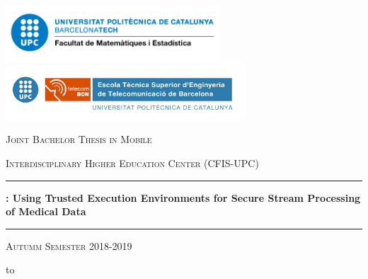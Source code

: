 \thispagestyle{empty}
\begin{center}

    \includegraphics[width=8cm]{img/logo-fme.png} 
    \hfill
    \includegraphics[width=9cm]{img/logo-upc.png}

    \vspace{0.5cm}

    \Large
    \textsc{Joint Bachelor Thesis in Mobile} 

    \textsc{Interdisciplinary Higher Education Center (CFIS-UPC)}

    \LARGE
    \rule{\textwidth}{0.4pt}
    \textbf{\projName: Using Trusted Execution Environments for Secure Stream Processing of Medical Data}
    \rule[0.5cm]{\textwidth}{0.4pt}

    \vspace{-0.2cm}
    \Large
    \textsc{Autumm Semester 2018-2019}
    \vspace{0.7cm}

    \normalsize
    \leavevmode\hbox to 


\end{center}
